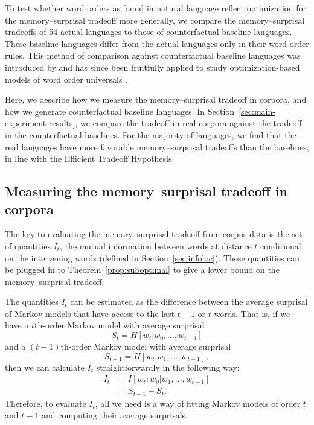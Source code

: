 To test whether word orders as found in natural language reflect optimization for the memory--surprisal tradeoff more generally, we compare the memory--surprisal tradeoffs of 54 actual languages to those of counterfactual baseline languages. These baseline languages differ from the actual languages only in their word order rules. This method of comparison against counterfactual baseline languages was introduced by \citet{gildea-optimizing-2007,gildea-grammars-2010} and has since been fruitfully applied to study optimization-based models of word order universals  \citep{futrell-large-scale-2015,gildea-human-2015,hahn2020universals}.

Here, we describe how we measure the memory--surprisal tradeoff in corpora, and how we generate counterfactual baseline languages. In Section~\ref{sec:main-experiment-results}, we compare the tradeoff in real corpora against the tradeoff in the counterfactual baselines. For the majority of languages, we find that the real languages have more favorable memory--surprisal tradeoffs than the baselines, in line with the Efficient Tradeoff Hypothesis.

\subsection{Measuring the memory--surprisal tradeoff in corpora}

The key to evaluating the memory--surprisal tradeoff from corpus data is the set of quantities $I_t$, the  mutual information between words at distance $t$ conditional on the intervening words (defined in Section~\ref{sec:infoloc}). 
These quantities can be plugged in to Theorem~\ref{prop:suboptimal} to give a lower bound on the memory--surprisal tradeoff.

The quantities $I_t$ can be estimated as the difference between the average surprisal of Markov models that have access to the last $t-1$ or $t$ words.
That is, if we have a $t$th-order Markov model with average surprisal
\begin{equation*}
    S_t = H[w_t | w_0, \dots, w_{t-1}]
\end{equation*}
and a $(t-1)$th-order Markov model with average surprisal
\begin{equation*}
    S_{t-1} = H[w_t | w_1, \dots, w_{t-1}],
\end{equation*}
then we can calculate $I_t$ straightforwardly in the following way:
\begin{align}
    \nonumber
    I_t &= I[w_t : w_0 | w_1, \dots, w_{t-1}] \\
    \nonumber
    &= S_{t-1} - S_t.
\end{align}
Therefore, to evaluate $I_t$, all we need is a way of fitting Markov models of order $t$ and $t-1$ and computing their average surprisals.

